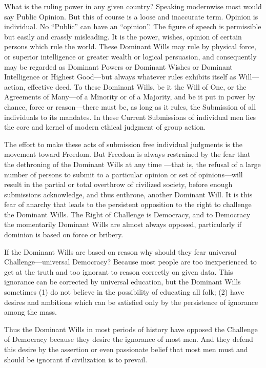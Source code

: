 \documentclass[letterpaper,10pt,english]{jupyterBook}
\begin{document}
\sphinxAtStartPar
What is the ruling power in any given country? Speaking modernwise most would say Public Opinion. But this of course is a loose and inaccurate term. Opinion is individual. No “Public” can have an “opinion”. The figure of speech is permissible but easily and crassly misleading. It is the power, wishes, opinion of certain persons which rule the world. These Dominant Wills may rule by physical force, or superior intelligence or greater wealth or logical persuasion, and consequently may be regarded as Dominant Powers or Dominant Wishes or Dominant Intelligence or Highest Good—but always whatever rules exhibits itself as Will—action, effective deed. To these Dominant Wills, be it the Will of One, or the Agreements of Many—of a Minority or of a Majority, and be it put in power by chance, force or reason—there must be, as long as it rules, the Submission of all individuals to its mandates. In these Current Submissions of individual men lies the core and kernel of modern ethical judgment of group action.

\sphinxAtStartPar
The effort to make these acts of submission free individual judgments is the movement toward Freedom. But Freedom is always restrained by the fear that the dethroning of the Dominant Wills at any time —that is, the refusal of a large number of persons to submit to a particular opinion or set of opinions—will result in the partial or total overthrow of civilized society, before enough submissions acknowledge, and thus enthrone, another Dominant Will. It is this fear of anarchy that leads to the persistent opposition to the right to challenge the Dominant Wills. The Right of Challenge is Democracy, and to Democracy the momentarily Dominant Wills are almost always opposed, particularly if dominion is based on force or bribery.

\sphinxAtStartPar
If the Dominant Wills are based on reason why should they fear universal Challenge—universal Democracy? Because most people are too inexperienced to get at the truth and too ignorant to reason correctly  on given data. This ignorance can be corrected by universal education, but the Dominant Wills sometimes (1) do not believe in the possibility of educating all folk; (2) have desires and ambitions which can be satisfied only by the persistence of ignorance among the mass.

\sphinxAtStartPar
Thus the Dominant Wills in most periods of history have opposed the Challenge of Democracy because they desire the ignorance of most men. And they defend this desire by the assertion or even passionate belief that most men must and should be ignorant if civilization is to prevail.
\end{document}
